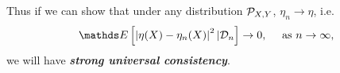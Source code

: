 \documentclass[11pt]{article}
\begin{document}
\begin{itemize}
Thus if we can show that under any distribution ${\mathcal P}_{X,Y}$, $\eta_n \rightarrow \eta$, i.e.
\begin{align*}
\E{}{\abs{\eta(X) - \eta_n(X)}^2 | \cD_n} \rightarrow 0, \quad \text{ as }n\rightarrow \infty,
\end{align*} we will have \emph{\textbf{strong universal consistency}}.


\end{itemize}
\end{document}
